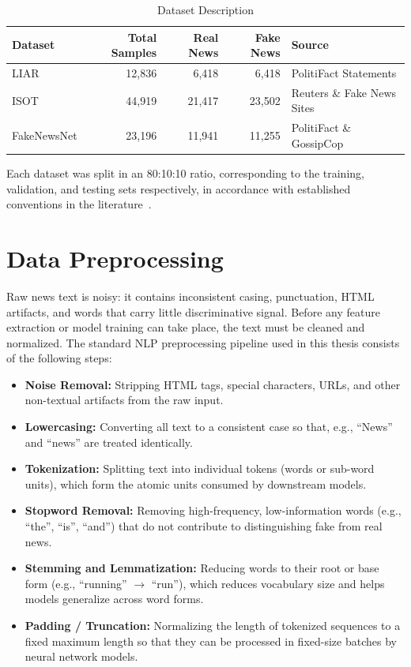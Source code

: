\begin{table}[htbp]
\small
\setlength{\tabcolsep}{3pt}
\centering
\caption{Dataset Description}
\label{tab:datasets}
\begin{tabularx}{\textwidth}{|l|r|r|r|X|}
\hline
\textbf{Dataset} & \textbf{Total Samples} & \textbf{Real News} & \textbf{Fake News} & \textbf{Source} \\ \hline
LIAR & 12,836 & 6,418 & 6,418 & PolitiFact Statements \\
ISOT & 44,919 & 21,417 & 23,502 & Reuters \& Fake News Sites \\
FakeNewsNet & 23,196 & 11,941 & 11,255 & PolitiFact \& GossipCop \\ \hline
\end{tabularx}
\end{table}

Each dataset was split in an 80:10:10 ratio, corresponding to the training, validation, and testing sets respectively, in accordance with established conventions in the literature~\citep{Kaliyar2021FakeBERT,Rai2022FakeNews}.

\section{Data Preprocessing}
\label{sec:preprocessing}

Raw news text is noisy: it contains inconsistent casing, punctuation, HTML artifacts, and words that carry little discriminative signal. Before any feature extraction or model training can take place, the text must be cleaned and normalized. The standard NLP preprocessing pipeline used in this thesis consists of the following steps:

\begin{itemize}
\item \textbf{Noise Removal:} Stripping HTML tags, special characters, URLs, and other non-textual artifacts from the raw input.
\item \textbf{Lowercasing:} Converting all text to a consistent case so that, e.g., ``News'' and ``news'' are treated identically.
\item \textbf{Tokenization:} Splitting text into individual tokens (words or sub-word units), which form the atomic units consumed by downstream models.
\item \textbf{Stopword Removal:} Removing high-frequency, low-information words (e.g., ``the'', ``is'', ``and'') that do not contribute to distinguishing fake from real news.
\item \textbf{Stemming and Lemmatization:} Reducing words to their root or base form (e.g., ``running'' $\rightarrow$ ``run''), which reduces vocabulary size and helps models generalize across word forms.
\item \textbf{Padding / Truncation:} Normalizing the length of tokenized sequences to a fixed maximum length so that they can be processed in fixed-size batches by neural network models.
\end{itemize}


